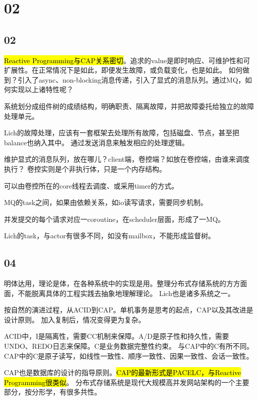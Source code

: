 \section{02}

\subsection{02}

\hl{Reactive Programming与CAP关系密切}。追求的value是即时响应、可维护性和可扩展性。在正常情况下是如此，即便发生故障，或负载变化，也是如此。
如何做到？引入了async、non-blocking消息传递，引入了显式的消息队列。通过MQ，如何实现以上诸特性呢？

系统划分成组件树的成绩结构，明确职责、隔离故障，并把故障委托给独立的故障处理单元。

\hrulefill

Lich的故障处理，应该有一套框架去处理所有故障，包括磁盘、节点，甚至把balance也纳入其中。
通过发送消息来触发相应的处理逻辑。

维护显式的消息队列，放在哪儿？client端，卷控端？如放在卷控端，由谁来调度执行？
卷控实则是个非执行体，只是一个内存结构。

可以由卷控所在的core线程去调度、或采用timer的方式。

MQ的task之间，如果由依赖关系，如io读写请求，需要同步机制。

并发提交的每个请求对应一coroutine，在scheduler层面，形成了一MQ。

\hrulefill

Lich的task，与actor有很多不同，如没有mailbox，不能形成监督树。

\subsection{04}

明体达用，理论是体，在各种系统中的实现是用。整理分布式存储系统的方方面面，不能脱离具体的工程实践去抽象地理解理论。
Lich也是诸多系统之一。

按自然的演进过程，从ACID到CAP。单机事务是思考的起点，CAP以及其改进是设计原则。
加入复制后，情况变得更为复杂。

ACID中，I是隔离性，需要CC机制来保障。A/D是原子性和持久性，需要UNDO、REDO日志来保障。C是业务数据完整性约束。
与CAP中的C有所不同。CAP中的C是原子读写，如线性一致性、顺序一致性、因果一致性、会话一致性。

CAP也是数据库的设计的指导原则。\hl{CAP的最新形式是PACELC，与Reactive Programming很类似}。
分布式存储系统是现代大规模高并发网站架构的一个主要部分，按分形学，有很多共性。

